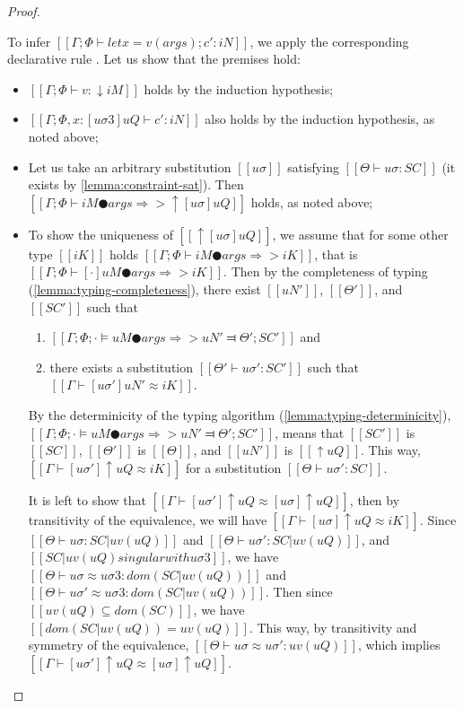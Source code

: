 \begin{proof}
\begin{caseof}
        To infer $[[Γ ; Φ ⊢ let x = v(args) ; c' : iN ]]$, 
        we apply the corresponding 
        declarative rule .
        Let us show that the premises hold:
        \begin{itemize}
            \item $[[Γ; Φ ⊢ v : ↓iM]]$ holds by the induction hypothesis;
            \item $[[Γ; Φ, x:[uσ3]uQ ⊢ c' : iN]]$ also holds by the induction hypothesis, as noted above;
            \item Let us take an arbitrary substitution $[[uσ]]$ 
                satisfying $[[Θ ⊢ uσ : SC]]$ (it exists by \cref{lemma:constraint-sat}).
                Then $[[Γ; Φ ⊢ iM ● args ⇒> ↑[uσ]uQ ]]$ holds, as noted above;
            \item To show the uniqueness of $[[↑[uσ]uQ]]$,
                we assume that for some other type $[[iK]]$ 
                holds $[[Γ; Φ ⊢ iM ● args ⇒> iK ]]$,
                that is $[[Γ; Φ ⊢ [·]uM ● args ⇒> iK ]]$.
                Then by the completeness of typing 
                (\cref{lemma:typing-completeness}),
                there exist $[[uN']]$, $[[Θ']]$, and $[[SC']]$ such that
                \begin{enumerate}
                    \item $[[ Γ; Φ; · ⊨ uM ● args ⇒> uN' ⫤ Θ'; SC' ]]$ and
                    \item there exists a substitution $[[Θ' ⊢ uσ' : SC']]$ such that
                    $[[Γ ⊢ [uσ']uN' ≈ iK]]$.
                \end{enumerate}
            By the determinicity of the typing algorithm (\cref{lemma:typing-determinicity}),
            $[[ Γ; Φ; · ⊨ uM ● args ⇒> uN' ⫤ Θ'; SC' ]]$,
            means that $[[SC']]$ is $[[SC]]$, $[[Θ']]$ is $[[Θ]]$, and $[[uN']]$ is
            $[[↑uQ]]$. 
            This way, $[[Γ ⊢ [uσ']↑uQ ≈ iK]]$ for a substitution 
            $[[Θ ⊢ uσ' : SC]]$. 

            It is left to show that $[[Γ ⊢ [uσ']↑uQ ≈ [uσ]↑uQ]]$, 
            then by transitivity of the equivalence, we will have $[[Γ ⊢ [uσ]↑uQ ≈ iK]]$.
            Since $[[Θ ⊢ uσ : SC|uv(uQ)]]$ and $[[Θ ⊢ uσ' : SC|uv(uQ)]]$, 
            and $[[SC|uv(uQ) singular with uσ3]]$, we have 
            $[[Θ ⊢ uσ ≈ uσ3 : dom(SC|uv(uQ))]]$
            and $[[Θ ⊢ uσ' ≈ uσ3 : dom(SC|uv(uQ))]]$.
            Then since $[[uv(uQ) ⊆ dom(SC)]]$, we have $[[dom(SC|uv(uQ)) = uv(uQ)]]$.
            This way, by transitivity and symmetry of the equivalence, 
            $[[Θ ⊢ uσ ≈ uσ' : uv(uQ)]]$, which implies
            $[[Γ ⊢ [uσ']↑uQ ≈ [uσ]↑uQ]]$. 
        \end{itemize}


\end{caseof}
\end{proof}
